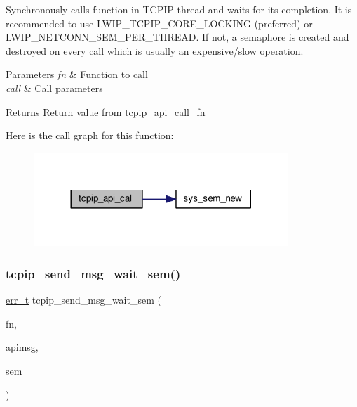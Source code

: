 Synchronously calls function in T\+C\+P\+IP thread and waits for its completion. It is recommended to use L\+W\+I\+P\+\_\+\+T\+C\+P\+I\+P\+\_\+\+C\+O\+R\+E\+\_\+\+L\+O\+C\+K\+I\+NG (preferred) or L\+W\+I\+P\+\_\+\+N\+E\+T\+C\+O\+N\+N\+\_\+\+S\+E\+M\+\_\+\+P\+E\+R\+\_\+\+T\+H\+R\+E\+AD. If not, a semaphore is created and destroyed on every call which is usually an expensive/slow operation. 
\begin{DoxyParams}{Parameters}
{\em fn} & Function to call \\
\hline
{\em call} & Call parameters \\
\hline
\end{DoxyParams}
\begin{DoxyReturn}{Returns}
Return value from tcpip\+\_\+api\+\_\+call\+\_\+fn 
\end{DoxyReturn}
Here is the call graph for this function\+:
\nopagebreak
\begin{figure}[H]
\begin{center}
\leavevmode
\includegraphics[width=272pt]{openmote-cc2538_2lwip_2src_2include_2lwip_2priv_2tcpip__priv_8h_a3d42b0c46607f91aedcc7745ed466b08_cgraph}
\end{center}
\end{figure}
\mbox{\label{openmote-cc2538_2lwip_2src_2include_2lwip_2priv_2tcpip__priv_8h_a12bdf37eddcd72c4178e3ea7d370395d}} 
\subsubsection{\texorpdfstring{tcpip\+\_\+send\+\_\+msg\+\_\+wait\+\_\+sem()}{tcpip\_send\_msg\_wait\_sem()}}
{\footnotesize\ttfamily \hyperlink{group__infrastructure__errors_gaf02d9da80fd66b4f986d2c53d7231ddb}{err\+\_\+t} tcpip\+\_\+send\+\_\+msg\+\_\+wait\+\_\+sem (\begin{DoxyParamCaption}\item[{\hyperlink{openmote-cc2538_2lwip_2src_2include_2lwip_2tcpip_8h_a35203296bb838f3b493839ffc6e7285d}{tcpip\+\_\+callback\+\_\+fn}}]{fn,  }\item[{void $\ast$}]{apimsg,  }\item[{sys\+\_\+sem\+\_\+t $\ast$}]{sem }\end{DoxyParamCaption})}


